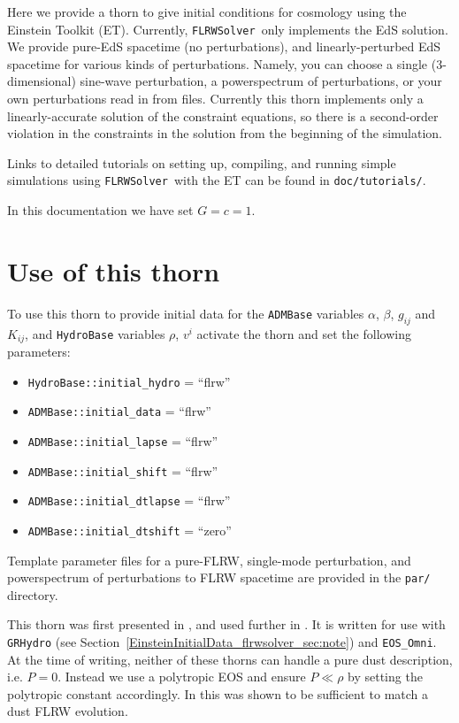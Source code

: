 Here we provide a thorn to give initial conditions for cosmology using the Einstein Toolkit (ET). Currently, \texttt{FLRWSolver}\ only implements the EdS solution. We provide pure-EdS spacetime (no perturbations), and linearly-perturbed EdS spacetime for various kinds of perturbations. Namely, you can choose a single (3-dimensional) sine-wave perturbation, a powerspectrum of perturbations, or your own perturbations read in from files. 
Currently this thorn implements only a linearly-accurate solution of the constraint equations, so there is a second-order violation in the constraints in the solution from the beginning of the simulation. %

Links to detailed tutorials on setting up, compiling, and running simple simulations using \texttt{FLRWSolver}\ with the ET can be found in \texttt{doc/tutorials/}.

In this documentation we have set $G=c=1$.

\section{Use of this thorn}

To use this thorn to provide initial data for the {\tt ADMBase} variables $\alpha$, $\beta$, $g_{ij}$ and $K_{ij}$, and {\tt HydroBase} variables $\rho$, $v^i$ activate the thorn and set the following parameters: 
\begin{itemize}
	\item \texttt{HydroBase::initial\_hydro} = ``flrw''
	\item \texttt{ADMBase::initial\_data} = ``flrw''
	\item \texttt{ADMBase::initial\_lapse} = ``flrw''
	\item \texttt{ADMBase::initial\_shift} = ``flrw''
	\item \texttt{ADMBase::initial\_dtlapse} = ``flrw''
	\item \texttt{ADMBase::initial\_dtshift} = ``zero''
\end{itemize}

Template parameter files for a pure-FLRW, single-mode perturbation, and powerspectrum of perturbations to FLRW spacetime are provided in the {\tt par/} directory. 

This thorn was first presented in \cite{EinsteinInitialData_flrwsolver_macpherson2017}, and used further in \cite{EinsteinInitialData_flrwsolver_macpherson2019}. It is written for use with {\tt GRHydro} (see Section~\ref{EinsteinInitialData_flrwsolver_sec:note}) and {\tt EOS\_Omni}. At the time of writing, neither of these thorns can handle a pure dust description, i.e. $P=0$. Instead we use a polytropic EOS and ensure $P\ll\rho$ by setting the polytropic constant accordingly. In \cite{EinsteinInitialData_flrwsolver_macpherson2017} this was shown to be sufficient to match a dust FLRW evolution.




